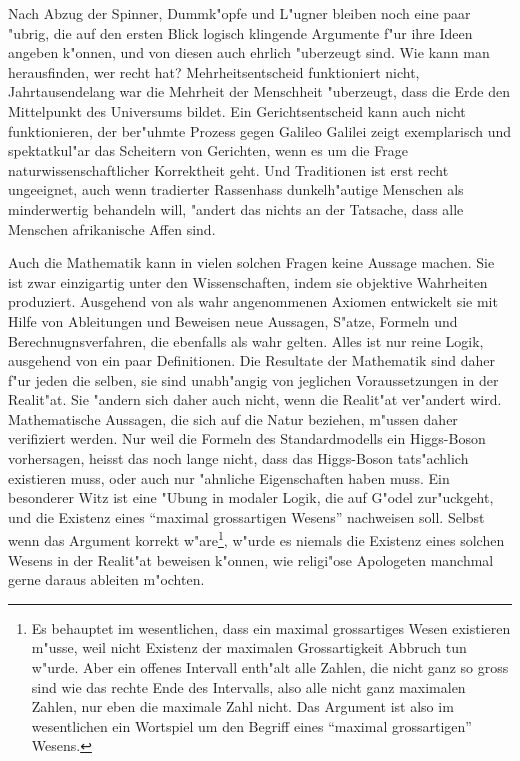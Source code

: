 Nach Abzug der Spinner, Dummk"opfe und L"ugner bleiben noch eine
paar "ubrig, die auf den ersten Blick logisch klingende Argumente
f"ur ihre Ideen angeben k"onnen, und von diesen auch ehrlich 
"uberzeugt sind.
Wie kann man herausfinden, wer recht hat?
Mehrheitsentscheid funktioniert nicht, Jahrtausendelang war
die Mehrheit der Menschheit "uberzeugt, dass die Erde den Mittelpunkt
des Universums bildet.
Ein Gerichtsentscheid kann auch nicht funktionieren, der ber"uhmte
Prozess gegen Galileo Galilei zeigt exemplarisch und spektatkul"ar
das Scheitern von Gerichten, wenn es um die Frage naturwissenschaftlicher
Korrektheit geht.
Und Traditionen ist erst recht ungeeignet, auch wenn tradierter Rassenhass
dunkelh"autige Menschen als minderwertig behandeln will, "andert das
nichts an der Tatsache, dass alle Menschen afrikanische Affen sind.

Auch die Mathematik kann in vielen solchen Fragen keine Aussage machen.
Sie ist zwar einzigartig unter den Wissenschaften, indem
sie objektive Wahrheiten produziert.
Ausgehend von als wahr angenommenen Axiomen entwickelt sie mit 
Hilfe von Ableitungen und Beweisen neue Aussagen, S"atze, Formeln
und Berechnugnsverfahren, die ebenfalls als wahr gelten.
Alles ist nur reine Logik, ausgehend von ein paar Definitionen.
Die Resultate der Mathematik sind daher f"ur jeden die selben, 
sie sind unabh"angig von jeglichen Voraussetzungen in der Realit"at.
Sie "andern sich daher auch nicht, wenn die Realit"at ver"andert wird.
Mathematische Aussagen, die sich auf die Natur beziehen, m"ussen daher
verifiziert werden.
Nur weil die Formeln des Standardmodells ein Higgs-Boson vorhersagen,
heisst das noch lange nicht, dass das Higgs-Boson tats"achlich existieren
muss, oder auch nur "ahnliche Eigenschaften haben muss.
Ein besonderer Witz ist eine "Ubung in modaler Logik, die auf G"odel
zur"uckgeht, und die Existenz eines ``maximal grossartigen Wesens'' 
nachweisen soll. 
Selbst wenn das Argument korrekt w"are\footnote{Es behauptet im wesentlichen,
dass ein maximal grossartiges Wesen existieren m"usse, weil nicht Existenz
der maximalen Grossartigkeit Abbruch tun w"urde.
Aber ein offenes Intervall enth"alt alle Zahlen, die nicht ganz so gross
sind wie das rechte Ende des Intervalls, also alle nicht ganz maximalen
Zahlen, nur eben die maximale Zahl nicht.
Das Argument ist also im wesentlichen ein Wortspiel um den Begriff eines
``maximal grossartigen'' Wesens.}, w"urde es niemals die Existenz eines
solchen Wesens in der Realit"at beweisen k"onnen, wie religi"ose
Apologeten manchmal gerne daraus ableiten m"ochten.

